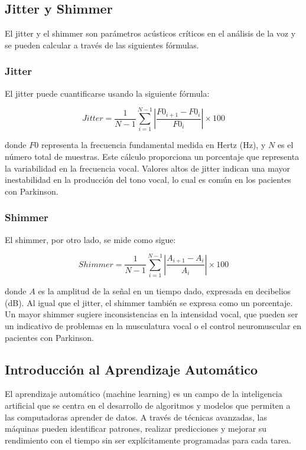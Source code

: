 \documentclass[listof=nochaptergap,12pt,times,authoryear]{report}
\begin{document}
\subsection{Jitter y Shimmer}

El jitter y el shimmer son parámetros acústicos críticos en el análisis de la voz y se pueden calcular a través de las siguientes fórmulas.

\subsubsection{Jitter}

El jitter puede cuantificarse usando la siguiente fórmula:

\begin{equation}
    Jitter = \frac{1}{N-1} \sum_{i=1}^{N-1} \left| \frac{F0_{i+1} - F0_{i}}{F0_{i}} \right| \times 100
\end{equation}

donde \(F0\) representa la frecuencia fundamental medida en Hertz (Hz), y \(N\) es el número total de muestras. Este cálculo proporciona un porcentaje que representa la variabilidad en la frecuencia vocal. Valores altos de jitter indican una mayor inestabilidad en la producción del tono vocal, lo cual es común en los pacientes con Parkinson.

\subsubsection{Shimmer}

El shimmer, por otro lado, se mide como sigue:

\begin{equation}
    Shimmer = \frac{1}{N-1} \sum_{i=1}^{N-1} \left| \frac{A_{i+1} - A_{i}}{A_{i}} \right| \times 100
\end{equation}

donde \(A\) es la amplitud de la señal en un tiempo dado, expresada en decibelios (dB). Al igual que el jitter, el shimmer también se expresa como un porcentaje. Un mayor shimmer sugiere inconsistencias en la intensidad vocal, que pueden ser un indicativo de problemas en la musculatura vocal o el control neuromuscular en pacientes con Parkinson.

\subsection{Introducción al Aprendizaje Automático}

El aprendizaje automático (machine learning) es un campo de la inteligencia artificial que se centra en el desarrollo de algoritmos y modelos que permiten a las computadoras aprender de datos. A través de técnicas avanzadas, las máquinas pueden identificar patrones, realizar predicciones y mejorar su rendimiento con el tiempo sin ser explícitamente programadas para cada tarea.
\end{document}
